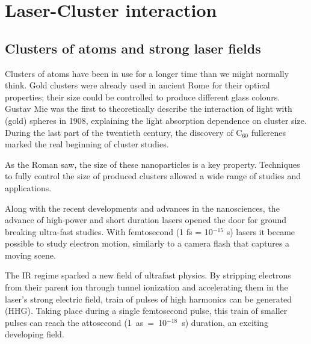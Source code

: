 
\section{Laser-Cluster interaction}

\subsection{Clusters of atoms and strong laser fields}

Clusters of atoms have been in use for a longer time than we might normally
think. Gold clusters were already used in ancient Rome for their optical
properties; their size could be controlled to produce different glass colours.
Gustav Mie was the first to theoretically describe the interaction of light
with (gold) spheres in 1908, explaining the light absorption dependence
on cluster size. During the last part of the twentieth century, the discovery of
C$_{60}$ fullerenes marked the real beginning of cluster studies.


As the Roman saw, the size of these nanoparticles is a key property. Techniques to fully
control the size of produced clusters allowed a wide range of studies and
applications.



Along with the recent developments and advances in the nanosciences,
the advance of high-power and short duration lasers opened the
door for
ground breaking
%
ultra-fast studies. With femtosecond
(1 fs = 10$^{-15}$ s) lasers it became possible to study electron motion,
similarly to a camera flash that captures a moving scene.

The IR regime sparked a new field of ultrafast physics. By stripping electrons
from their parent ion through tunnel ionization and accelerating them in the
laser's strong electric field, train of pulses of high harmonics can be generated (HHG).
Taking place during a single femtosecond pulse, this train of smaller pulses
can reach the attosecond \mbox{(1 as = 10$^{-18}$ s)} duration, an exciting developing field.





